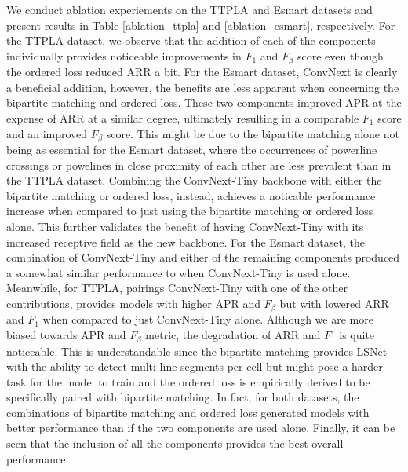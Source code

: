 \documentclass[journal]{IEEEtran}
\begin{document}
We conduct ablation experiements on the TTPLA and Esmart datasets and present results in Table \ref{ablation_ttpla} and \ref{ablation_esmart}, respectively. For the TTPLA dataset, we observe that the addition of each of the components individually provides noticeable improvements in $F_1$ and $F_{\beta}$ score even though the ordered loss reduced ARR a bit. 
For the Esmart dataset, ConvNext is clearly a beneficial addition, however, the benefits are less apparent when concerning the bipartite matching and ordered loss. These two components improved APR at the expense of ARR at a similar degree, ultimately resulting in a comparable $F_1$ score and an improved $F_{\beta}$ score. This might be due to the bipartite matching alone not being as essential for the Esmart dataset, where the occurrences of powerline crossings or powelines in close proximity of each other are less prevalent than in the TTPLA dataset. Combining the ConvNext-Tiny backbone with either the bipartite matching or ordered loss, instead, achieves a noticable performance increase when compared to just using the bipartite matching or ordered loss alone. This further validates the benefit of having ConvNext-Tiny with its increased receptive field as the new backbone. For the Esmart dataset, the combination of ConvNext-Tiny and either of the remaining components produced a somewhat similar performance to when ConvNext-Tiny is used alone. Meanwhile, for TTPLA, pairings ConvNext-Tiny with one of the other contributions, provides models with higher APR and $F_{\beta}$ but with lowered ARR and $F_1$ when compared to just ConvNext-Tiny alone. Although we are more biased towards APR and $F_{\beta}$ metric, the degradation of ARR and $F_1$ is quite noticeable. This is understandable since the bipartite matching provides LSNet with the ability to detect multi-line-segments per cell but might pose a harder task for the model to train and the ordered loss is empirically derived to be specifically paired with bipartite matching. In fact, for both datasets, the combinations of bipartite matching and ordered loss generated models with better performance than if the two components are used alone. Finally, it can be seen that the inclusion of all the components provides the best overall performance.
\end{document}
